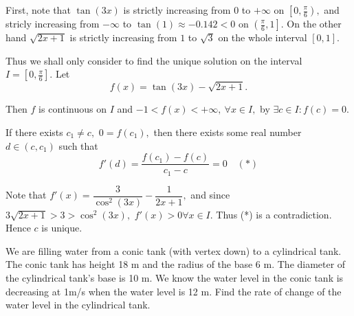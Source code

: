 \documentclass{article}
\begin{document}
\begin{soln}[Solution 1]
    First, note that $\tan(3x)$ is strictly increasing from $0$ to $+\infty$ on $\left[ 0, \frac{\pi}{6} \right),$
    and stricly increasing from $-\infty$ to $\tan(1) \approx -0.142 < 0$ on $\left( \frac{\pi}{6}, 1 \right].$
    On the other hand $\sqrt{2x + 1}$ is strictly increasing from $1$ to $\sqrt{3}$ on the whole interval $[0,1].$

    Thus we shall only consider to find the unique solution on the interval $I = \left[ 0, \frac{\pi}{6} \right].$
    Let
    \[
        f(x) = \tan(3x) - \sqrt{2x + 1}.
    \]
    
    Then $f$ is continuous on $I$ and $-1 < f(x) < +\infty,\ \forall x \in I,$
    by  $\exists c \in I: f(c) = 0.$

    If there exists $c_1 \ne c,$ $0 = f(c_1),$ then there exists some real number $d \in (c,c_1)$ such that 
    \[
        f'(d) = \frac{f(c_1) - f(c)}{c_1 - c} = 0 \quad (*)
    \]
    
    Note that $ f'(x) = \dfrac{3}{\cos^2(3x)} - \dfrac{1}{2x+1},$ and since $3\sqrt{2x + 1} > 3 > \cos^2(3x),$ $f'(x) > 0 \forall x\in I.$
    Thus (*) is a contradiction. Hence $c$ is unique.
\end{soln}

\newpage

\begin{problem*}[4]
    We are filling water from a conic tank (with vertex down) to a cylindrical tank.
    The conic tank has height 18 m and the radius of the base 6 m. The diameter of the cylindrical tank’s base is 10 m.
    We know the water level in the conic tank is decreasing at 1m/s when the water level is 12 m.
    Find the rate of change of the water level in the cylindrical tank.
\end{problem*}
\end{document}
